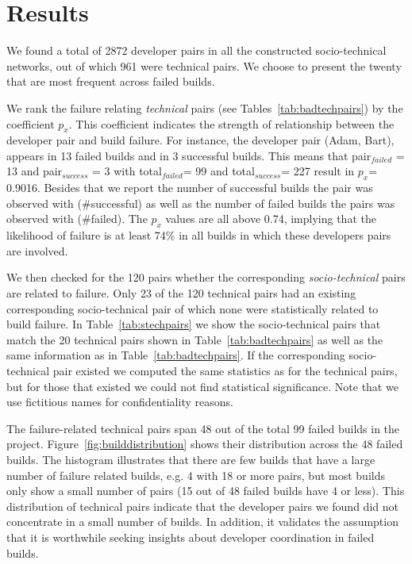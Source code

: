 \section{Results}
\label{ch:fse:result2}
We found a total of 2872 developer pairs in all the constructed
socio-technical networks, out of which 961 were technical pairs. %
We choose to present the twenty that are most frequent across failed builds.

We rank the failure relating \emph{technical} pairs (see Tables~\ref{tab:badtechpairs})
by the coefficient $p_{x}$. This coefficient indicates the strength of
relationship between the developer pair and build failure. For instance, the
developer pair (Adam, Bart), appears in 13 failed builds and in 3
successful builds. This means that pair$_{failed}$ = 13 and pair$_{success}$ = 3
with total$_{failed}$= 99 and total$_{success}$= 227 result in $p_x$= 0.9016.
Besides that we report the number of successful builds the pair was observed with
(\#successful) as well as the number of failed builds the pairs was observed with
(\#failed). The $p_x$ values are all above 0.74, implying that the likelihood
of failure is at least 74\% in all builds in which these developers pairs are
involved. 

We then checked for the 120 pairs whether the corresponding \emph{socio-technical} pairs are related to failure.
Only 23 of the 120 technical pairs had an existing corresponding socio-technical pair of which none were statistically related to build failure. 
In Table~\ref{tab:stechpairs} we show the socio-technical pairs that match the 20 technical pairs shown in Table~\ref{tab:badtechpairs} as well as the same information as in Table~\ref{tab:badtechpairs}.
If the corresponding socio-technical pair existed we computed the same statistics as for the technical pairs, but for those that existed we could not find statistical significance.
Note that we use fictitious names for confidentiality reasons.

The failure-related technical pairs span 48 out of the total 99 failed builds in
the project. Figure~\ref{fig:builddistribution} shows their distribution
 across the 48 failed builds. The histogram
illustrates that there are few builds that have a large number of failure related
builds, e.g. 4 with 18 or more pairs, but most builds only show a small number of
pairs (15 out of 48 failed builds have 4 or less). 
This distribution of technical pairs indicate that the developer
pairs we found  did not concentrate in a small number of builds. 
In addition, it validates the assumption that it is
worthwhile seeking insights about developer coordination in failed builds.


